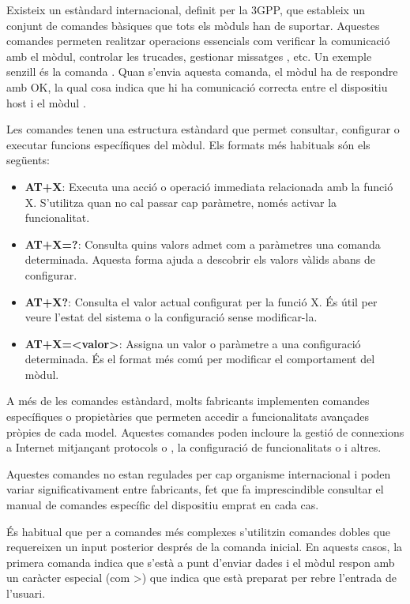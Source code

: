 \documentclass{tfgitic}[2024/07/01]
\begin{document}
Existeix un estàndard internacional, definit per la 3GPP, que estableix un conjunt de comandes  bàsiques que tots els mòduls han de suportar. Aquestes comandes 
permeten realitzar operacions essencials com verificar la comunicació amb el mòdul, controlar les trucades, gestionar missatges , etc. Un exemple senzill és la 
comanda . Quan s'envia aquesta comanda, el mòdul ha de respondre amb OK, la qual cosa indica que hi ha comunicació correcta entre el dispositiu host i el mòdul .

Les comandes  tenen una estructura estàndard que permet consultar, configurar o executar funcions específiques del mòdul. Els formats més habituals són els següents:

\begin{itemize}
  \item \textbf{AT+X}: Executa una acció o operació immediata relacionada amb la funció X. S'utilitza quan no cal passar cap paràmetre, només activar la funcionalitat.
  
  \item \textbf{AT+X=?}: Consulta quins valors admet com a paràmetres una comanda determinada. Aquesta forma ajuda a descobrir els valors vàlids abans de configurar.
  
  \item \textbf{AT+X?}: Consulta el valor actual configurat per la funció X. És útil per veure l'estat del sistema o la configuració sense modificar-la.
  
  \item \textbf{AT+X=<valor>}: Assigna un valor o paràmetre a una configuració determinada. És el format més comú per modificar el comportament del mòdul.
\end{itemize} 

A més de les comandes estàndard, molts fabricants implementen comandes  específiques o propietàries que permeten accedir a funcionalitats avançades pròpies de cada 
model. Aquestes comandes poden incloure la gestió de connexions a Internet mitjançant protocols  o , la configuració de funcionalitats  o  i altres.

Aquestes comandes no estan regulades per cap organisme internacional i poden variar significativament entre fabricants, fet que fa imprescindible consultar el manual 
de comandes  específic del dispositiu emprat en cada cas.

És habitual que per a comandes més complexes s'utilitzin comandes  dobles que requereixen un input posterior després de la comanda inicial. En aquests casos, la primera comanda 
indica que s'està a punt d'enviar dades i el mòdul respon amb un caràcter especial (com >) que indica que està preparat per rebre l'entrada de l'usuari. 
\end{document}
